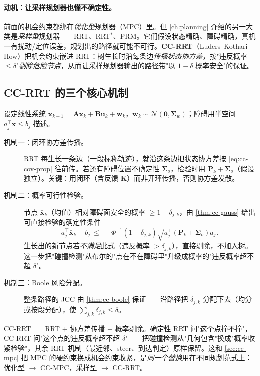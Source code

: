 \paragraph{动机：让采样规划器也懂不确定性。}
前面的机会约束都绑在\emph{优化型}规划器（MPC）里。但 \cref{ch:planning} 介绍的另一大类是\emph{采样型}规划器——RRT、RRT$^*$、PRM。它们假设状态精确、障碍精确，真机一有扰动/定位误差，规划出的路径就可能不可行。\textbf{CC-RRT}（Luders--Kothari--How\cite{luders2010chance}）把机会约束嵌进 RRT：树生长时沿每条边\emph{传播状态协方差}，按"违反概率 $\le\delta$"\emph{剔除危险节点}，从而让采样规划器输出的路径带"以 $1-\delta$ 概率安全"的保证。

\subsection{CC-RRT 的三个核心机制}
\label{sec:cc-rrt-mech}

设定线性系统 $\mathbf{x}_{k+1}=\mathbf{A}\mathbf{x}_k+\mathbf{B}\mathbf{u}_k+\mathbf{w}_k$，$\mathbf{w}_k\sim\mathcal{N}(\mathbf{0},\boldsymbol{\Sigma}_w)$；障碍用半空间 $a_j^\top\mathbf{x}\le b_j$ 描述。

\begin{description}
  \item[机制一：闭环协方差传播。] RRT 每生长一条边（一段标称轨迹），就沿这条边把状态协方差按 \cref{eq:cc-cov-prop} 往前传。若还有障碍位置不确定性 $\boldsymbol{\Sigma}_o$，检验时用 $\mathbf{P}_k+\boldsymbol{\Sigma}_o$（假设独立）。关键：用闭环（含反馈 $\mathbf{K}$）而非开环传播，否则协方差发散。
  \item[机制二：概率可行性检验。] 节点 $\bar{\mathbf{x}}_k$（均值）相对障碍面安全的概率 $\ge1-\delta_{j,k}$，由 \cref{thm:cc-gauss} 给出可直接检验的确定性条件
  \begin{equation}
    a_j^\top\bar{\mathbf{x}}_k-b_j\ \le\ -\Phi^{-1}(1-\delta_{j,k})\sqrt{a_j^\top(\mathbf{P}_k+\boldsymbol{\Sigma}_o)a_j}.
    \label{eq:cc-rrt-feasible}
  \end{equation}
  生长出的新节点若\emph{不满足}此式（违反概率 $>\delta_{j,k}$），直接剔除，不加入树。这一步把"碰撞检测"从布尔的"点在不在障碍里"升级成概率的"违反概率超不超 $\delta$"。
  \item[机制三：Boole 风险分配。] 整条路径的 JCC 由 \cref{thm:cc-boole} 保证——沿路径把 $\delta_{j,k}$ 分配下去（均分或按段分配），使 $\sum_{j,k}\delta_{j,k}\le\delta$。
\end{description}

\begin{insight}
CC-RRT $=$ RRT $+$ 协方差传播 $+$ 概率剔除。确定性 RRT 问"这个点撞不撞"，CC-RRT 问"这个点的违反概率超不超 $\delta$"——把碰撞检测从"几何包含"换成"概率收紧检验"，其余 RRT 机制（最近邻、steer、到达判定）原样保留。这和 \cref{sec:cc-mpc} 把 MPC 的硬约束换成机会约束收紧，是\emph{同一个替换}用在不同规划范式上：优化型 $\to$ CC-MPC，采样型 $\to$ CC-RRT。
\end{insight}

